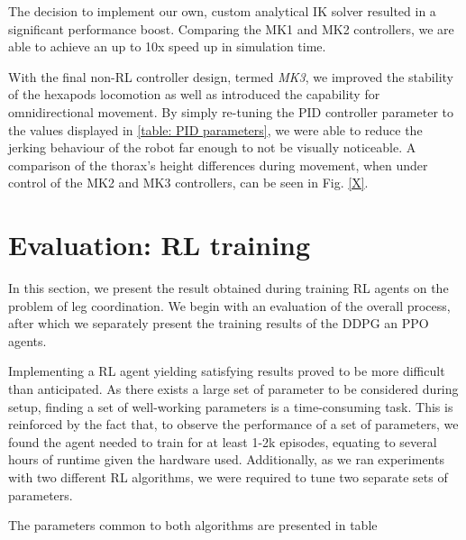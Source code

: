 The decision to implement our own, custom analytical IK solver resulted in a significant performance boost.
Comparing the MK1 and MK2 controllers, we are able to achieve an up to 10x speed up in simulation time.

With the final non-RL controller design, termed \textit{MK3}, we improved the stability of the hexapods locomotion as well as introduced the capability for omnidirectional movement.
By simply re-tuning the PID controller parameter to the values displayed in \ref{table: PID parameters}, we were able to reduce the jerking behaviour of the robot far enough to not be visually noticeable.
A comparison of the thorax's height differences during movement, when under control of the MK2 and MK3 controllers, can be seen in Fig. \ref{X}. 



\section{Evaluation: RL training}
In this section, we present the result obtained during training RL agents on the problem of leg coordination.
We begin with an evaluation of the overall process, after which we separately present the training results of the DDPG an PPO agents.

Implementing a RL agent yielding satisfying results proved to be more difficult than anticipated.
As there exists a large set of parameter to be considered during setup, finding a set of well-working parameters is a time-consuming task.
This is reinforced by the fact that, to observe the performance of a set of parameters, we found the agent needed to train for at least 1-2k episodes, equating to several hours of runtime given the hardware used.
Additionally, as we ran experiments with two different RL algorithms, we were required to tune two separate sets of parameters.

The parameters common to both algorithms are presented in table 

{\def\arraystretch{1.4}\tabcolsep=5pt
}

